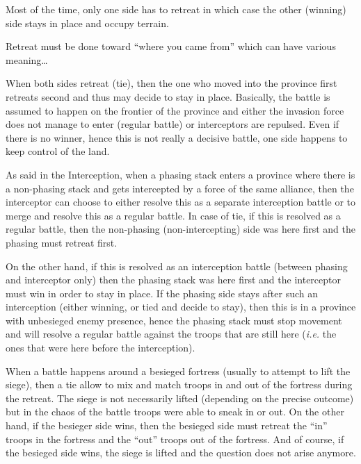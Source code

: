 \begin{designnote}
  Most of the time, only one side has to retreat in which case the other
  (winning) side stays in place and occupy terrain.

  Retreat must be done toward ``where you came from'' which can have various
  meaning\ldots

  When both sides retreat (tie), then the one who moved into the province
  first retreats second and thus may decide to stay in place. Basically, the
  battle is assumed to happen on the frontier of the province and either the
  invasion force does not manage to enter (regular battle) or interceptors are
  repulsed. Even if there is no winner, hence this is not really a decisive
  battle, one side happens to keep control of the land.

  \smallskip

  As said in the Interception, when a phasing stack enters a province where
  there is a non-phasing stack and gets intercepted by a force of the same
  alliance, then the interceptor can choose to either resolve this as a
  separate interception battle or to merge and resolve this as a regular
  battle. In case of tie, if this is resolved as a regular battle, then the
  non-phasing (non-intercepting) side was here first and the phasing must
  retreat first.

  On the other hand, if this is resolved as an interception battle (between
  phasing and interceptor only) then the phasing stack was here first and the
  interceptor must win in order to stay in place. If the phasing side stays
  after such an interception (either winning, or tied and decide to stay),
  then this is in a province with unbesieged enemy presence, hence the phasing
  stack must stop movement and will resolve a regular battle against the
  troops that are still here (\emph{i.e.} the ones that were here before the
  interception).

  \smallskip

  When a battle happens around a besieged fortress (usually to attempt to lift
  the siege), then a tie allow to mix and match troops in and out of the
  fortress during the retreat. The siege is not necessarily lifted (depending
  on the precise outcome) but in the chaos of the battle troops were able to
  sneak in or out. On the other hand, if the besieger side wins, then the
  besieged side must retreat the ``in'' troops in the fortress and the ``out''
  troops out of the fortress. And of course, if the besieged side wins, the
  siege is lifted and the question does not arise anymore.
\end{designnote}

